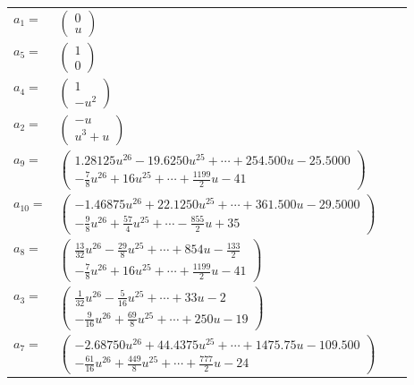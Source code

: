 \documentclass[1p]{elsarticle_modified}
\theoremstyle{definition}
\begin{document}
\begin{tabular}{m{7pt} m{180pt} m{7pt} m{180pt} }
\flushright $a_{1}=$&$\begin{pmatrix}0\\u\end{pmatrix}$ \\
\flushright $a_{5}=$&$\begin{pmatrix}1\\0\end{pmatrix}$ \\
\flushright $a_{4}=$&$\begin{pmatrix}1\\- u^2\end{pmatrix}$ \\
\flushright $a_{2}=$&$\begin{pmatrix}- u\\u^3+u\end{pmatrix}$ \\
\flushright $a_{9}=$&$\begin{pmatrix}1.28125 u^{26}-19.6250 u^{25}+\cdots+254.500 u-25.5000\\-\frac{7}{8} u^{26}+16 u^{25}+\cdots+\frac{1199}{2} u-41\end{pmatrix}$ \\
\flushright $a_{10}=$&$\begin{pmatrix}-1.46875 u^{26}+22.1250 u^{25}+\cdots+361.500 u-29.5000\\-\frac{9}{8} u^{26}+\frac{57}{4} u^{25}+\cdots-\frac{855}{2} u+35\end{pmatrix}$ \\
\flushright $a_{8}=$&$\begin{pmatrix}\frac{13}{32} u^{26}-\frac{29}{8} u^{25}+\cdots+854 u-\frac{133}{2}\\-\frac{7}{8} u^{26}+16 u^{25}+\cdots+\frac{1199}{2} u-41\end{pmatrix}$ \\
\flushright $a_{3}=$&$\begin{pmatrix}\frac{1}{32} u^{26}-\frac{5}{16} u^{25}+\cdots+33 u-2\\-\frac{9}{16} u^{26}+\frac{69}{8} u^{25}+\cdots+250 u-19\end{pmatrix}$ \\
\flushright $a_{7}=$&$\begin{pmatrix}-2.68750 u^{26}+44.4375 u^{25}+\cdots+1475.75 u-109.500\\-\frac{61}{16} u^{26}+\frac{449}{8} u^{25}+\cdots+\frac{777}{2} u-24\end{pmatrix}$ \\

\end{tabular}
\end{document}
